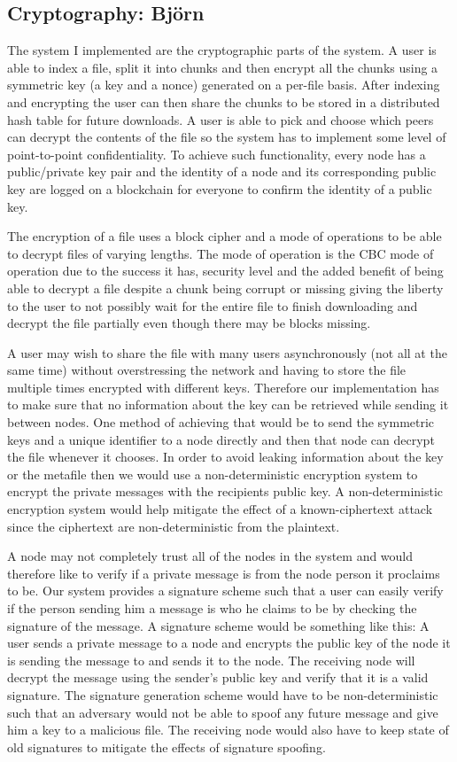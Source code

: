 \documentclass[12pt,a4paper,draft]{article}
\begin{document}
\subsection{Cryptography: Björn}

The system I implemented are the cryptographic parts of the system.
A user is able to index a file, split it into chunks and then encrypt all the chunks using a symmetric key (a key and a nonce) generated on a per-file basis.
After indexing and encrypting the user can then share the chunks to be stored in a distributed hash table for future downloads.
A user is able to pick and choose which peers can decrypt the contents of the file so the system has to implement some level of point-to-point confidentiality.
To achieve such functionality, every node has a public/private key pair and the identity of a node and its corresponding public key are logged on a blockchain for everyone to confirm the identity of a public key.

The encryption of a file uses a block cipher and a mode of operations to be able to decrypt files of varying lengths.
The mode of operation is the CBC mode of operation due to the success it has, security level and the added benefit of being able to decrypt a file despite a chunk being corrupt or missing giving the liberty to the user to not possibly wait for the entire file to finish downloading and decrypt the file partially even though there may be blocks missing.

A user may wish to share the file with many users asynchronously (not all at the same time) without overstressing the network and having to store the file multiple times encrypted with different keys.
Therefore our implementation has to make sure that no information about the key can be retrieved while sending it between nodes.
One method of achieving that would be to send the symmetric keys and a unique identifier to a node directly and then that node can decrypt the file whenever it chooses.
In order to avoid leaking information about the key or the metafile then we would use a non-deterministic encryption system to encrypt the private messages with the recipients public key.
A non-deterministic encryption system would help mitigate the effect of a known-ciphertext attack since the ciphertext are non-deterministic from the plaintext.

A node may not completely trust all of the nodes in the system and would therefore like to verify if a private message is from the node person it proclaims to be.
Our system provides a signature scheme such that a user can easily verify if the person sending him a message is who he claims to be by checking the signature of the message.
A signature scheme would be something like this: A user sends a private message to a node and encrypts the public key of the node it is sending the message to and sends it to the node.
The receiving node will decrypt the message using the sender's public key and verify that it is a valid signature.
The signature generation scheme would have to be non-deterministic such that an adversary would not be able to spoof any future message and give him a key to a malicious file.
The receiving node would also have to keep state of old signatures to mitigate the effects of signature spoofing.
\end{document}
